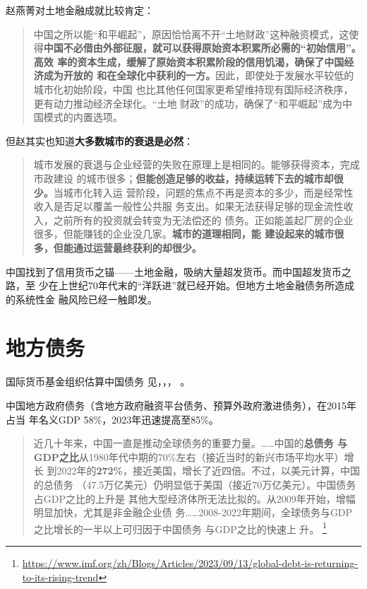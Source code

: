 赵燕菁对土地金融成就比较肯定：
\begin{quotation}
  中国之所以能“和平崛起”，原因恰恰离不开“土地财政”这种融资模式，这使
  得\textbf{中国不必借由外部征服，就可以获得原始资本积累所必需的“初始信用”。高效
    率的资本生成，缓解了原始资本积累阶段的信用饥渴，确保了中国经济成为开放的
    和在全球化中获利的一方。}因此，即使处于发展水平较低的城市化初始阶段，中国
  也比其他任何国家更希望维持现有国际经济秩序，更有动力推动经济全球化。“土地
  财政”的成功，确保了“和平崛起”成为中国模式的内置选项。
\end{quotation}

但赵其实也知道\textbf{大多数城市的衰退是必然}：
\begin{quotation}
  城市发展的衰退与企业经营的失败在原理上是相同的。能够获得资本，完成市政建设
  的城市很多；\textbf{但能创造足够的收益，持续运转下去的城市却很少。}当城市化转入运
  营阶段，问题的焦点不再是资本的多少，而是经常性收入是否足以覆盖一般性公共服
  务支出。如果无法获得足够的现金流性收入，之前所有的投资就会转变为无法偿还的
  债务。正如能盖起厂房的企业很多，但能赚钱的企业没几家。\textbf{城市的道理相同，能
    建设起来的城市很多，但能通过运营最终获利的却很少。}
\end{quotation}

中国找到了信用货币之锚——土地金融，吸纳大量超发货币。而中国超发货币之路，至
少在上世纪70年代末的“洋跃进”就已经开始。但地方土地金融债务所造成的系统性金
融风险已经一触即发。



\section{地方债务}



国际货币基金组织估算中国债务
见，，，
。

中国地方政府债务（含地方政府融资平台债务、预算外政府激进债务），在2015年占当
年名义GDP 58\%，2023年迅速提高至85\%。

\begin{quotation}
  近几十年来，中国一直是推动全球债务的重要力量。……中国的\textbf{总债务
    与GDP之比}从1980年代中期的70\%左右（接近当时的新兴市场平均水平）增长
  到2022年的\textbf{272\%}，接近美国，增长了近四倍。不过，以美元计算，中国的总债务
  （47.5万亿美元）仍明显低于美国（接近70万亿美元）。中国债务占GDP之比的上升是
  其他大型经济体所无法比拟的。从2009年开始，增幅明显加快，尤其是非金融企业债
  务……2008-2022年期间，全球债务与GDP之比增长的一半以上可归因于中国债务
  与GDP之比的快速上
  升。
  \footnote{\url{https://www.imf.org/zh/Blogs/Articles/2023/09/13/global-debt-is-returning-to-its-rising-trend}}
\end{quotation}

